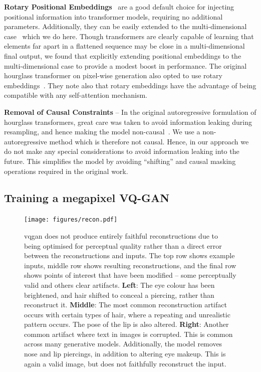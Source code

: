 \textbf{Rotary Positional Embeddings}~\cite{su2021roformer} are a good default
choice for injecting positional information into transformer models, requiring
no additional parameters. Additionally, they can be easily extended to the
multi-dimensional case~\cite{rope-eleutherai} which we do here. Though
transformers are clearly capable of learning that elements far apart in a
flattened sequence may be close in a multi-dimensional final output, we found
that explicitly extending positional embeddings to the multi-dimensional case to
provide a modest boost in performance. The original hourglass transformer on
pixel-wise generation also opted to use rotary
embeddings~\cite{nawrot2021hierarchical}. They note also that rotary embeddings
have the advantage of being compatible with any self-attention mechanism.

\textbf{Removal of Causal Constraints} -- In the original autoregressive
formulation of hourglass transformers, great care was taken to avoid information
leaking during resampling, and hence making the model
non-causal~\cite{nawrot2021hierarchical}. We use a non-autoregressive method
which is therefore not causal. Hence, in our approach we do not make any special
considerations to avoid information leaking into the future. This simplifies the
model by avoiding ``shifting'' and causal masking operations required in the original work.

\subsection{Training a megapixel VQ-GAN}
\label{sec:megagan}

\begin{figure}[ht]
    \label{fig:recon}
    \centering
    \texttt{[image: figures/recon.pdf]}
    \caption{
        \gls{vqgan} does not produce entirely faithful reconstructions due to
        being optimised for perceptual quality rather than a direct error between
        the reconstructions and inputs. The top row shows example inputs, middle row
        shows resulting reconstructions, and the final row shows points of interest that
        have been modified -- some perceptually valid and others clear
        artifacts. 
        \textbf{Left}: The eye colour has been brightened, and hair
        shifted to conceal a piercing, rather than reconstruct it.
        \textbf{Middle}: The most common reconstruction artifact occurs with
        certain types of hair, where a repeating and unrealistic pattern occurs. The
        pose of the lip is also altered. 
        \textbf{Right}: Another common artifact where text in images is
        corrupted. This is common across many generative models. Additionally,
        the model removes nose and lip piercings, in addition to altering eye
        makeup. This is again a valid image, but does not faithfully reconstruct
        the input.}
\end{figure}

